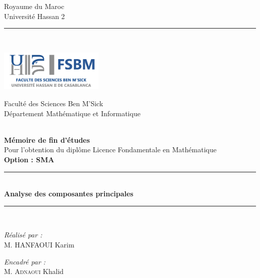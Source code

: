 \documentclass[a4paper,12pt]{report}
\begin{document}
\sloppy

\begin{titlepage}
\centering
{\small Royaume du Maroc}\\
{\small Université Hassan 2}\\
\rule{\linewidth}{0.3mm} \\[0.4cm]

\begin{minipage}{5cm}
\begin{center}
\includegraphics[width=5cm]{logo-fsbVF.png}
\end{center}
\end{minipage}\hfill
\begin{minipage}{10cm}
\begin{flushright}
{\small Faculté des Sciences Ben M’Sick}\\[0.1cm]
{\small Département Mathématique et Informatique}\\[0.1cm]
\end{flushright}
\end{minipage}\hfill\\
\vspace{20mm}
{\large \bfseries Mémoire de fin d’études}\\[0.5cm]
{\large Pour l'obtention du diplôme Licence Fondamentale en Mathématique}\\[0.5cm]
{\large \bfseries{Option : SMA} \\ }
\vspace{10mm}
\rule{\linewidth}{0.3mm} \\[0.4cm]
{ \huge \bfseries Analyse des composantes principales\\[0.4cm] }
\rule{\linewidth}{0.3mm} \\[1cm]
\vspace{10mm}

\noindent
\begin{minipage}{0.5\textwidth}
\vspace{-7mm}
\begin{flushleft} \large
\emph{Réalisé par :}\\
M. \textsc{HANFAOUI} Karim \\
\end{flushleft}
\end{minipage}
\begin{minipage}{0.4\textwidth}
\begin{flushright} \large
\emph{Encadré par :} \\
M. \textsc{Adnaoui} Khalid \\
\end{flushright}
\end{minipage}\\[1cm]


\end{titlepage}
\end{document}
